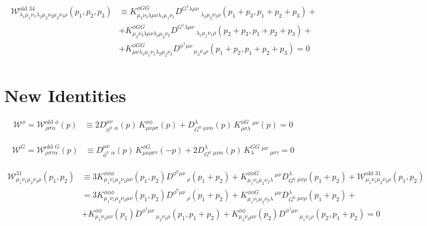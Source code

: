 \documentclass[11pt, oneside]{article}   	%
\newcommand{\W}{\mathcal{W}}
\begin{document}
\begin{align}
 \begin{split} \W^{\text{old }34}_{\lambda_1 \mu_1 \nu_ 1 \lambda_2 \mu_2 \nu_2 \mu_3 \nu_3 \rho} (p_1 , p_2 , p_3 ) &\equiv K^{\phi G G}_{\mu_3 \nu_3 \lambda \mu \nu \lambda_1 \mu_1 \nu_1} D^{G^{1} \lambda \mu \nu}\,_{\lambda_2 \mu_2 \nu_2 \rho} (p_1 + p_3 , p_1 +p_2 + p_3 ) +\\ &+ K^{\phi G G}_{\mu_3 \nu_3 \lambda \mu \nu \lambda_2 \mu_2 \nu_2} D^{G^{1} \lambda \mu \nu}\,_{\lambda_1 \mu_1 \nu_1 \rho} (p_2 + p_3 , p_1 +p_2 + p_3 ) + \\ &+ K^{\phi G G}_{\mu \nu \lambda_1 \mu_1 \nu_1 \lambda_2 \mu_2 \nu_2} D^{\phi^{1}\mu \nu}\,_{\mu_3 \nu_3 \rho} (p_1 + p_2 , p_1 +p_2 + p_3 ) = 0\end{split} \end{align}

\section{New Identities}

\begin{equation} \begin{split} \W^\phi = \W^{\text{old }\phi}_{\rho\sigma\alpha}(p)
    &\equiv
      2D_{\phi^0}^{\mu\nu}\,_{\alpha}(p)\,K^{\phi\phi}_{\mu\nu\rho\sigma}(p)
    + D_{G^0}^{\lambda}\,_{\mu\nu\alpha}(p)\,K^{\phi G}_{\rho\sigma\lambda}\,^{\mu\nu}(p)
    = 0  \end{split} \end{equation}
    
   \begin{equation}  \begin{split}  \W^G = \W^{\text{old } G} _{\rho\sigma\tau\alpha}(p)
    &\equiv
      D_{\phi^0}^{\mu\nu}\,_{\alpha}(p)\,K^{\phi G}_{\mu\nu\rho\sigma\tau} (-p)
    + 2D_{G^0}^{\lambda}\,_{\mu\nu\alpha}(p)\,K^{GG}_{\lambda}\,^{\mu\nu}\,_{\rho\sigma\tau}
    = 0 \end{split} \end{equation}
    
    \begin{equation} \begin{split} \W^{31}_{\mu_1 \nu_1 \mu_2 \nu_2 \rho} (p_1, p_2) &\equiv 3 K^{\phi\phi\phi}_{\mu_1 \nu_1 \mu_2 \nu_2 \mu \nu} (p_1, p_2) D^{\phi^{0} \mu \nu}\,_{\rho} (p_1 + p_2) + K^{\phi \phi G}_{\mu_1 \nu_1 \mu_2 \nu_2 \lambda}\,^{\mu \nu} D_{G^{0}}^\lambda \,_{\mu\nu \rho} (p_1 + p_2) +  \W^{\text{old }31}_{\mu_1 \nu_ 1 \mu_2 \nu_2 \rho} (p_1 , p_2 ) \\ &= 3 K^{\phi\phi\phi}_{\mu_1 \nu_1 \mu_2 \nu_2 \mu \nu} (p_1, p_2) D^{\phi^{0} \mu \nu}\,_{\rho} (p_1 + p_2) + K^{\phi \phi G}_{\mu_1 \nu_1 \mu_2 \nu_2 \lambda}\,^{\mu \nu} D_{G^{0}}^\lambda \,_{\mu\nu \rho} (p_1 + p_2) + \\&+  K^{\phi\phi}_{\mu_1 \nu_ 1 \mu \nu} (p_{1} ) D^{\phi^{1} \mu \nu}\,_{\mu_2 \nu_2 \rho} (p_{1}, p_{1} + p_{2}) + K^{\phi\phi}_{\mu_2 \nu_ 2 \mu \nu} (p_{2}) D^{\phi^{1} \mu \nu}\,_{\mu_1 \nu_ 1 \rho} (p_{2},p_{1}+p_{2}) = 0 \end{split}
 \end{equation}
    
\end{document}
